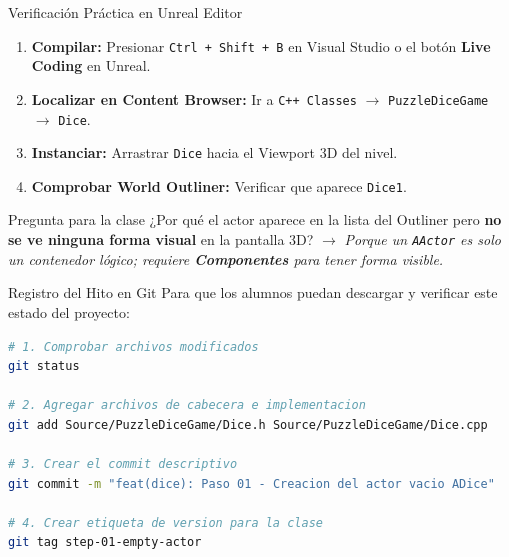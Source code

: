 \documentclass[aspectratio=169, 10pt]{beamer}
\begin{document}
\begin{frame}{Verificación Práctica en Unreal Editor}
    \begin{enumerate}
        \item \textbf{Compilar:} Presionar \texttt{Ctrl + Shift + B} en Visual Studio o el botón \textbf{Live Coding} en Unreal.
        \item \textbf{Localizar en Content Browser:} Ir a \texttt{C++ Classes} $\rightarrow$ \texttt{PuzzleDiceGame} $\rightarrow$ \texttt{Dice}.
        \item \textbf{Instanciar:} Arrastrar \texttt{Dice} hacia el Viewport 3D del nivel.
        \item \textbf{Comprobar World Outliner:} Verificar que aparece \texttt{Dice1}.
    \end{enumerate}

    \vspace{0.2cm}
    \begin{alertblock}{Pregunta para la clase}
        ¿Por qué el actor aparece en la lista del Outliner pero \textbf{no se ve ninguna forma visual} en la pantalla 3D?
        \newline
        $\rightarrow$ \textit{Porque un \texttt{AActor} es solo un contenedor lógico; requiere \textbf{Componentes} para tener forma visible.}
    \end{alertblock}
\end{frame}

\begin{frame}[fragile]{Registro del Hito en Git}
    Para que los alumnos puedan descargar y verificar este estado del proyecto:

    \vspace{0.2cm}
    \begin{lstlisting}[language=bash]
# 1. Comprobar archivos modificados
git status

# 2. Agregar archivos de cabecera e implementacion
git add Source/PuzzleDiceGame/Dice.h Source/PuzzleDiceGame/Dice.cpp

# 3. Crear el commit descriptivo
git commit -m "feat(dice): Paso 01 - Creacion del actor vacio ADice"

# 4. Crear etiqueta de version para la clase
git tag step-01-empty-actor
    \end{lstlisting}
\end{frame}
\end{document}

